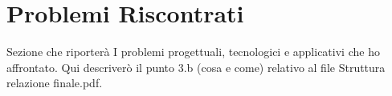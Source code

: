 \section{Problemi Riscontrati}

Sezione che riporterà I problemi progettuali, tecnologici e applicativi che ho affrontato.
Qui descriverò il punto 3.b (cosa e come) relativo al file Struttura relazione finale.pdf.



